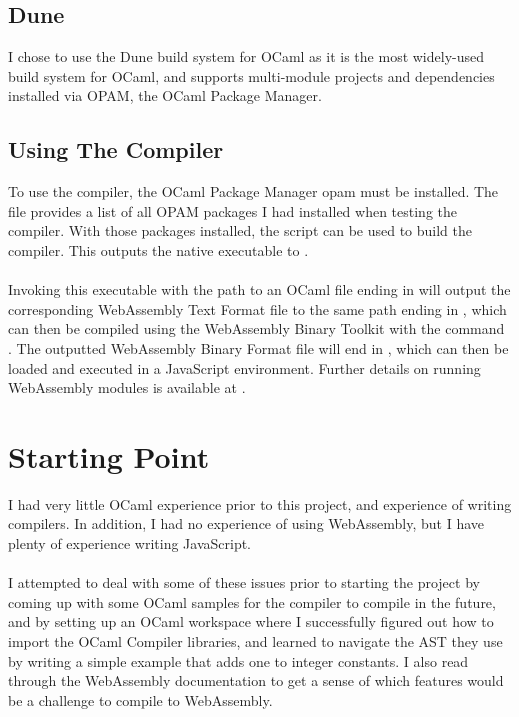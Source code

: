 \subsection{Dune}
I chose to use the Dune \cite{Dune} build system for OCaml as it is the most widely-used build system for OCaml, and supports multi-module projects and dependencies installed via OPAM, the OCaml Package Manager.

\subsection{Using The Compiler}
To use the compiler, the OCaml Package Manager opam \cite{Opam} must be installed. The file  provides a list of all OPAM packages I had installed when testing the compiler. With those packages installed, the script  can be used to build the compiler. This outputs the native executable to .
\\\\
Invoking this executable with the path to an OCaml file ending in  will output the corresponding WebAssembly Text Format file to the same path ending in , which can then be compiled using the WebAssembly Binary Toolkit with the command . The outputted WebAssembly Binary Format file will end in , which can then be loaded and executed in a JavaScript environment. Further details on running WebAssembly modules is available at \cite{Load_wasm}.


\section{Starting Point}
I had very little OCaml experience prior to this project, and experience of writing compilers. In addition, I had no experience of using WebAssembly, but I have plenty of experience writing JavaScript.
\\\\
I attempted to deal with some of these issues prior to starting the project by coming up with some OCaml samples for the compiler to compile in the future, and by setting up an OCaml workspace where I successfully figured out how to import the OCaml Compiler libraries, and learned to navigate the AST they use by writing a simple example that adds one to integer constants. I also read through the WebAssembly documentation to get a sense of which features would be a challenge to compile to WebAssembly.
